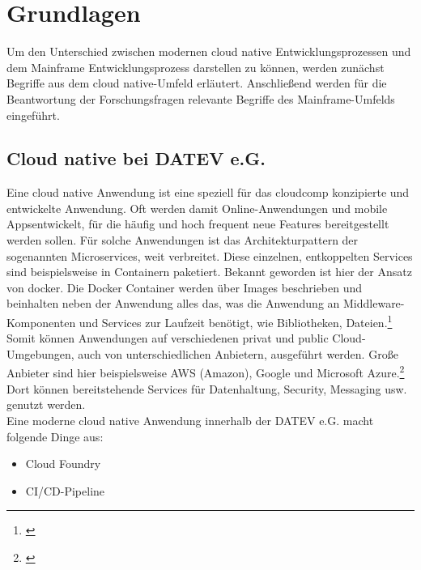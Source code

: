 \chapter{Grundlagen}\label{ch:grundlagen}
Um den Unterschied zwischen modernen cloud native Entwicklungsprozessen und dem Mainframe Entwicklungsprozess darstellen zu können, werden zunächst Begriffe aus dem cloud native-Umfeld erläutert.
Anschließend werden für die Beantwortung der Forschungsfragen relevante Begriffe des Mainframe-Umfelds eingeführt.

\section{Cloud native bei DATEV e.G.}\label{sec:cloudnative}
Eine cloud native Anwendung ist eine speziell für das \Gls{cloudcomp} konzipierte und entwickelte Anwendung.
Oft werden damit Online-Anwendungen und mobile \glqq Apps\grqq entwickelt, für die häufig und hoch frequent neue Features bereitgestellt werden sollen. 
Für solche Anwendungen ist das Architekturpattern der sogenannten \glqq Microservices\grqq, weit verbreitet.
Diese einzelnen, entkoppelten Services sind beispielsweise in Containern paketiert. 
Bekannt geworden ist hier der Ansatz von \Gls{docker}.
Die Docker Container werden über Images beschrieben und beinhalten neben der Anwendung alles das, was die Anwendung an Middleware-Komponenten und Services zur Laufzeit benötigt, wie Bibliotheken, Dateien.\footnote{\cite[Kap. 1]{Vohra.2016}}
Somit können Anwendungen auf verschiedenen \glqq privat\grqq{} und \glqq public\grqq{} Cloud-Umgebungen, auch von unterschiedlichen Anbietern, ausgeführt werden.
Große Anbieter sind hier beispielsweise AWS (Amazon), Google und Microsoft Azure.\footnote{\cite{.27.2.2020}}
Dort können bereitstehende Services für Datenhaltung, Security, Messaging usw. genutzt werden. 
\cite{.23.2.2020d}\\
Eine moderne cloud native Anwendung innerhalb der DATEV e.G. macht folgende Dinge aus:
\begin{itemize}
\item \glqq Cloud Foundry\grqq
\item CI/CD-Pipeline
\end{itemize}

